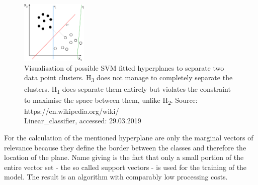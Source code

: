 \begin{figure} %
    \centerline{\includegraphics[trim={0 0 0 0},clip,width=0.28\textwidth]{img/Svm_separating_hyperplanes}}
  \caption{Visualisation of possible SVM fitted hyperplanes to separate two data point clusters. H\textsubscript{3} does not manage to completely separate the clusters. H\textsubscript{1} does separate them entirely but violates the constraint to maximise the space between them, unlike H\textsubscript{2}. Source: https://en.wikipedia.org/wiki/ \\ Linear\_classifier, accessed: 29.03.2019}
  \label{fig:SVM_visualisation}
\vspace{-0.5cm}
\end{figure}

For the calculation of the mentioned hyperplane are only the marginal vectors of relevance because they define the border between the classes and therefore the location of the plane. Name giving is the fact that only a small portion of the entire vector set - the so called support vectors - is used for the training of the model. The result is an algorithm with comparably low processing costs.

